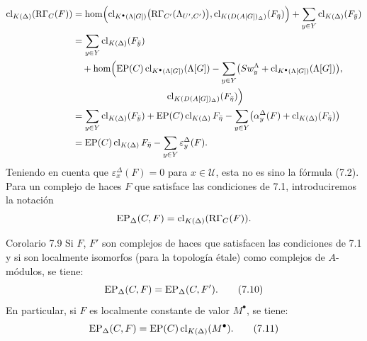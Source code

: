 \[
\begin{aligned}
\clK{\Delta}(\RG_C(F))
&=\operatorname{hom}\Bigl(
\clKstar{\Lambda[G]}\bigl(\RG_{C'}(\Lambda_{U',C'})\bigr),
\cl_{K(D(A[G])_\Delta)}(F_{\bar\eta})\Bigr)
 +\sum_{y\in Y}\clK{\Delta}(F_{\bar y})\\
&=\sum_{y\in Y}\clK{\Delta}(F_{\bar y})\\
&\quad +\operatorname{hom}\Bigl(
\EP(C)\clKstar{\Lambda[G]}(\Lambda[G])
 -\sum_{y\in Y}\bigl(Sw_y^{\Lambda}+\clKstar{\Lambda[G]}(\Lambda[G])\bigr),\\
&\hspace{10em}\cl_{K(D(A[G])_\Delta)}(F_{\bar\eta})\Bigr)\\
&=\sum_{y\in Y}\clK{\Delta}(F_{\bar y})
 +\EP(C)\clK{\Delta}F_{\bar\eta}
 -\sum_{y\in Y}\bigl(\alpha_y^\Delta(F)+\clK{\Delta}(F_{\bar\eta})\bigr)\\
&=\EP(C)\clK{\Delta}F_{\bar\eta}
 -\sum_{y\in Y}\varepsilon_y^\Delta(F).
\end{aligned}
\]
Teniendo en cuenta que $\varepsilon_x^\Delta(F)=0$ para $x\in\mathcal U$, esta no es sino la fórmula (7.2). Para un complejo de haces $F$ que satisface las condiciones de 7.1, introduciremos la notación
\[
\operatorname{EP}_\Delta(C,F)=\operatorname{cl}_{K(\Delta)}(\mathrm{R}\Gamma_C(F)).
\]

\begin{statement}{Corolario 7.9}
Si $F$, $F'$ son complejos de haces que satisfacen las condiciones de 7.1 y si son localmente isomorfos (para la topología étale) como complejos de $A$-módulos, se tiene:
\[
\operatorname{EP}_\Delta(C,F)=\operatorname{EP}_\Delta(C,F').
\tag{7.10}
\]
En particular, si $F$ es localmente constante de valor $M^\bullet$, se tiene:
\[
\operatorname{EP}_\Delta(C,F)=\operatorname{EP}(C)\operatorname{cl}_{K(\Delta)}(M^\bullet).
\tag{7.11}
\]
\end{statement}
